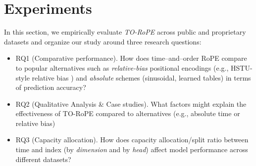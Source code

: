 \documentclass[sigconf]{acmart}
\begin{document}

\section{Experiments}

\label{sec:experiments}

In this section, we empirically evaluate \emph{TO-RoPE} across public and proprietary datasets and organize our study around three research questions:
\begin{itemize}
\item{RQ1 (Comparative performance).} How does time–and–order RoPE compare to popular alternatives such as \emph{relative-bias} positional encodings (e.g., HSTU-style relative bias \cite{Zhai2024ActionsSL}) and \emph{absolute} schemes (sinusoidal, learned tables) in terms of prediction accuracy?
\item{RQ2 (Qualitative Analysis \& Case studies).} What factors might explain the effectiveness of TO-RoPE compared to alternatives (e.g., absolute time or relative bias)

\item{RQ3 (Capacity allocation).} How does capacity allocation/split ratio between time and index (by \emph{dimension} and by \emph{head}) affect model performance across different datasets?

\end{itemize}
\end{document}
